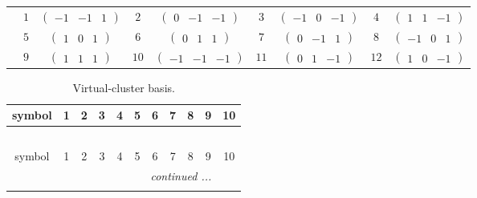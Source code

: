 \documentclass[fleqn,10pt,landscape]{article}
\begin{document}
\begin{itemize}
{\begin{center}
\begin{longtable}{ccccccccc}
 & $ 1 $ & $ \begin{pmatrix} -1 & -1 & 1 \end{pmatrix} $ & $ 2 $ & $ \begin{pmatrix} 0 & -1 & -1 \end{pmatrix} $ & $ 3 $ & $ \begin{pmatrix} -1 & 0 & -1 \end{pmatrix} $ & $ 4 $ & $ \begin{pmatrix} 1 & 1 & -1 \end{pmatrix} $ \\
& $ 5 $ & $ \begin{pmatrix} 1 & 0 & 1 \end{pmatrix} $ & $ 6 $ & $ \begin{pmatrix} 0 & 1 & 1 \end{pmatrix} $ & $ 7 $ & $ \begin{pmatrix} 0 & -1 & 1 \end{pmatrix} $ & $ 8 $ & $ \begin{pmatrix} -1 & 0 & 1 \end{pmatrix} $ \\
& $ 9 $ & $ \begin{pmatrix} 1 & 1 & 1 \end{pmatrix} $ & $ 10 $ & $ \begin{pmatrix} -1 & -1 & -1 \end{pmatrix} $ & $ 11 $ & $ \begin{pmatrix} 0 & 1 & -1 \end{pmatrix} $ & $ 12 $ & $ \begin{pmatrix} 1 & 0 & -1 \end{pmatrix} $ \\
\end{longtable}
\end{center}
\begin{center}
\renewcommand{\arraystretch}{1.7}
\begin{longtable}{ccccccccccc}
\caption{Virtual-cluster basis.}
 \\
 \hline \hline
symbol & 1 & 2 & 3 & 4 & 5 & 6 & 7 & 8 & 9 & 10 \\ \hline \endfirsthead

\multicolumn{10}{l}{\tablename\ \thetable{}} \\
 \hline \hline
symbol & 1 & 2 & 3 & 4 & 5 & 6 & 7 & 8 & 9 & 10 \\ \hline \endhead

 \hline \hline
\multicolumn{10}{r}{\footnotesize\it continued ...} \\ \endfoot


\end{longtable}
\end{center}}
\end{itemize}
\end{document}
